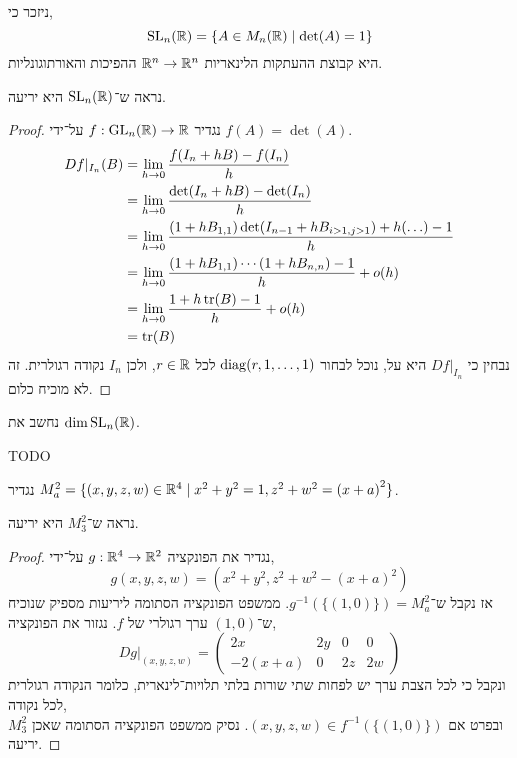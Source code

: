 \question{}
ניזכר כי,
\[
	\operatorname{SL}_n(\mathbb{R})
	= \{ A \in M_n(\mathbb{R}) \mid \det(A) = 1 \}
\]
היא קבוצת ההעתקות הלינאריות $\mathbb{R}^n \to \mathbb{R}^n$ ההפיכות והאורתוגונליות.

\subquestion{}
נראה ש־$\operatorname{SL}_n(\mathbb{R})$ היא יריעה.
\begin{proof}
	נגדיר $f : \operatorname{GL}_n(\mathbb{R}) \to \mathbb{R}$ על־ידי $f(A) = \det(A)$.
	\begin{align*}
		D f |_{I_n}(B)
		& = \lim_{h \to 0} \frac{f(I_n + h B) - f(I_n)}{h} \\
		& = \lim_{h \to 0} \frac{\det(I_n + h B) - \det(I_n)}{h} \\
		& = \lim_{h \to 0} \frac{(1 + h B_{1, 1}) \det(I_{n - 1} + h B_{i > 1, j > 1}) + h(\ldots) - 1}{h} \\
		& = \lim_{h \to 0} \frac{(1 + h B_{1, 1}) \cdots (1 + h B_{n, n}) - 1}{h} + o(h) \\
		& = \lim_{h \to 0} \frac{1 + h \operatorname{tr}(B) - 1}{h} + o(h) \\
		& = \operatorname{tr}(B)
	\end{align*}
	נבחין כי $D f |_{I_n}$ היא על, נוכל לבחור $\operatorname{diag}(r, 1, \ldots, 1)$ לכל $r \in \mathbb{R}$, ולכן $I_n$ נקודה רגולרית.
	זה לא מוכיח כלום.
\end{proof}

\subquestion{}
נחשב את $\dim \operatorname{SL}_n(\mathbb{R})$.
\begin{solution}
	TODO
\end{solution}

\question[4]
נגדיר $M_a^2 = \{ (x, y, z, w) \in \mathbb{R}^4 \mid x^2 + y^2 = 1, z^2 + w^2 = {(x + a)}^2 \}$.

\subquestion{}
נראה ש־$M_3^2$ היא יריעה.
\begin{proof}
	נגדיר את הפונקציה $g : \mathbb{R}^4 \to \mathbb{R}^2$ על־ידי,
	\[
		g(x, y, z, w)
		= (x^2 + y^2, z^2 + w^2 - {(x + a)}^2)
	\]
	אז נקבל ש־$g^{-1}(\{ (1, 0) \}) = M_a^2$.
	ממשפט הפונקציה הסתומה ליריעות מספיק שנוכיח ש־$(1, 0)$ ערך רגולרי של $f$.
	נגזור את הפונקציה,
	\[
		D g |_{(x, y, z, w)}
		= \begin{pmatrix}
			2x & 2y & 0 & 0 \\
			-2(x + a) & 0 & 2z & 2w
		\end{pmatrix}
	\]
	ונקבל כי לכל הצבת ערך יש לפחות שתי שורות בלתי תלויות־לינארית, כלומר הנקודה רגולרית לכל נקודה, \\
	ובפרט אם $(x, y, z, w) \in f^{-1}(\{ (1, 0) \})$.
	נסיק ממשפט הפונקציה הסתומה שאכן $M_3^2$ יריעה.
\end{proof}

